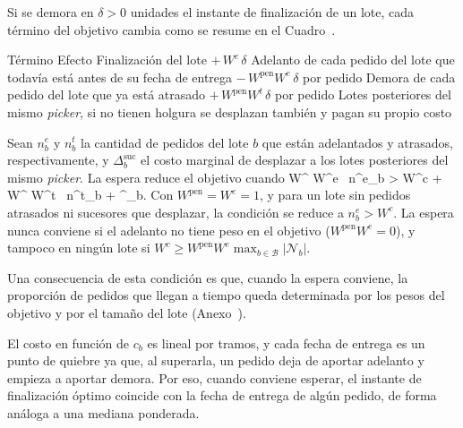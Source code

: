 \stopsubsection

\startsubsection[title={Cuándo esperar es conveniente}]

Si se demora en $\delta > 0$ unidades el instante de finalización de un
lote, cada término del objetivo cambia como se resume en el
Cuadro~.

\startplacetable[reference=tab:espera_balance, location=here, title={Efecto en la función objetivo de demorar en $\delta$ el instante de finalización de un lote.}]
	\bTABLE[split=yes, align=middle, frame=on, width=fit]
	\setupTABLE[row][1][background=color, backgroundcolor=darkgray, style=bold]
	\setupTABLE[column][1][width=7cm, align=flushleft]
	\setupTABLE[column][2][width=6cm, align=flushleft]
	\bTR \bTH Término \eTH \bTH Efecto \eTH \eTR
	\bTR \bTD Finalización del lote \eTD \bTD $+\, W^{c} \, \delta$ \eTD \eTR
	\bTR \bTD Adelanto de cada pedido del lote que todavía está antes de su fecha de entrega \eTD \bTD $-\, W^{\text{pen}} W^{e} \, \delta$ por pedido \eTD \eTR
	\bTR \bTD Demora de cada pedido del lote que ya está atrasado \eTD \bTD $+\, W^{\text{pen}} W^{t} \, \delta$ por pedido \eTD \eTR
	\bTR \bTD Lotes posteriores del mismo {\em picker}, si no tienen holgura \eTD \bTD se desplazan también y pagan su propio costo \eTD \eTR
	\eTABLE
\stopplacetable

Sean $n^{e}_b$ y $n^{t}_b$ la cantidad de pedidos del lote $b$ que están
adelantados y atrasados, respectivamente, y $\Delta^{\text{suc}}_b$ el costo
marginal de desplazar a los lotes posteriores del mismo {\em picker}. La
espera reduce el objetivo cuando
\startplaceformula[reference=eq:espera_condicion]
\startformula
	W^{} W^{e} \, n^{e}_b \;>\; W^{c} + W^{} W^{t} \, n^{t}_b + \Delta^{}_b.
\stopformula
\stopplaceformula
Con $W^{\text{pen}} = W^{e} = 1$, y para un lote sin pedidos atrasados ni
sucesores que desplazar, la condición se reduce a $n^{e}_b > W^{c}$. La
espera nunca conviene si el adelanto no tiene peso en el objetivo
($W^{\text{pen}} W^{e} = 0$), y tampoco en ningún lote si
$W^{c} \geq W^{\text{pen}} W^{e} \max_{b \in \mathcal{B}} |\mathcal{N}_b|$.

Una consecuencia de esta condición es que, cuando la espera conviene, la
proporción de pedidos que llegan a tiempo queda determinada por los pesos del
objetivo y por el tamaño del lote (Anexo~).

El costo en función de $c_b$ es lineal por tramos, y cada fecha de entrega
es un punto de quiebre ya que, al superarla, un pedido deja de aportar adelanto y
empieza a aportar demora. Por eso, cuando conviene esperar, el instante de
finalización óptimo coincide con la fecha de entrega de algún pedido, de
forma análoga a una mediana ponderada.

